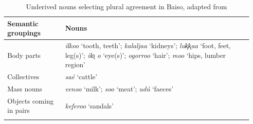 \documentclass[output=collectionpaper]{langsci/langscibook}
\begin{document}
\begin{table}
\caption{Underived nouns selecting plural agreement in Baiso, adapted from \cite[9]{Corbett1987}\label{tab:WDG:18}}
\begin{tabularx}{\textwidth}{lX}
\lsptoprule
Semantic groupings 	&	Nouns 	\\
\midrule
Body parts 	&	\textit{ilkoo} `tooth, teeth'; \textit{kalaljaa} `kidneys'; \textit{luk̟k̟aa} `foot, feet, leg(s)'; \textit{ilo̟ o} `eye(s)'; \textit{ogorroo} `hair'; \textit{moo} `hips, lumber region' 	\\
Collectives 	&	\textit{saé} `cattle' 	\\
Mass nouns 	&	\textit{eenoo} `milk'; \textit{soo} `meat'; \textit{udú} `faeces' 	\\
Objects coming in pairs 	&	\textit{keferoo} `sandals' 	\\
\lspbottomrule
\end{tabularx}
\end{table}
\end{document}
